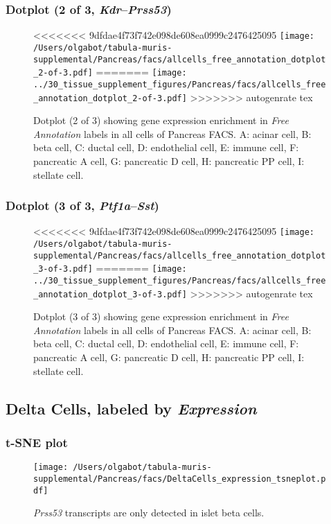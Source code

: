 \subsubsection{Dotplot (2 of 3, \emph{Kdr}--\emph{Prss53})}
\begin{figure}[h]
\centering
<<<<<<< 9dfdae4f73f742e098de608ea0999c2476425095
\texttt{[image: /Users/olgabot/tabula-muris-supplemental/Pancreas/facs/allcells\_free\_annotation\_dotplot\_2-of-3.pdf]}
=======
\texttt{[image: ../30\_tissue\_supplement\_figures/Pancreas/facs/allcells\_free\_annotation\_dotplot\_2-of-3.pdf]}
>>>>>>> autogenrate tex

\caption{ Dotplot (2 of 3)  showing gene expression enrichment in \emph{Free Annotation} labels in all cells of Pancreas FACS. A: acinar cell, B: beta cell, C: ductal cell, D: endothelial cell, E: immune cell, F: pancreatic A cell, G: pancreatic D cell, H: pancreatic PP cell, I: stellate cell.}
\end{figure}


\clearpage

\subsubsection{Dotplot (3 of 3, \emph{Ptf1a}--\emph{Sst})}
\begin{figure}[h]
\centering
<<<<<<< 9dfdae4f73f742e098de608ea0999c2476425095
\texttt{[image: /Users/olgabot/tabula-muris-supplemental/Pancreas/facs/allcells\_free\_annotation\_dotplot\_3-of-3.pdf]}
=======
\texttt{[image: ../30\_tissue\_supplement\_figures/Pancreas/facs/allcells\_free\_annotation\_dotplot\_3-of-3.pdf]}
>>>>>>> autogenrate tex

\caption{ Dotplot (3 of 3)  showing gene expression enrichment in \emph{Free Annotation} labels in all cells of Pancreas FACS. A: acinar cell, B: beta cell, C: ductal cell, D: endothelial cell, E: immune cell, F: pancreatic A cell, G: pancreatic D cell, H: pancreatic PP cell, I: stellate cell.}
\end{figure}


\clearpage

\subsection{Delta Cells, labeled by \emph{Expression}}

\clearpage
\subsubsection{t-SNE plot}
\begin{figure}[h]
\centering
\texttt{[image: /Users/olgabot/tabula-muris-supplemental/Pancreas/facs/DeltaCells\_expression\_tsneplot.pdf]}

\caption{\emph{Prss53} transcripts are only detected in islet beta cells.
}
\end{figure}


